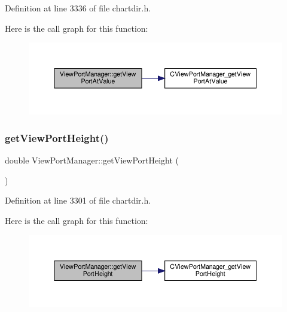 Definition at line 3336 of file chartdir.\+h.

Here is the call graph for this function\+:
\nopagebreak
\begin{figure}[H]
\begin{center}
\leavevmode
\includegraphics[width=350pt]{class_view_port_manager_a74886ad36dd990d09a70fc480cf9d7d7_cgraph}
\end{center}
\end{figure}
\mbox{\label{class_view_port_manager_ad1b3383ca3d0d4a87f1ca56bb8f1cb7e}} 
\subsubsection{\texorpdfstring{get\+View\+Port\+Height()}{getViewPortHeight()}}
{\footnotesize\ttfamily double View\+Port\+Manager\+::get\+View\+Port\+Height (\begin{DoxyParamCaption}{ }\end{DoxyParamCaption})\hspace{0.3cm}{\ttfamily [inline]}}



Definition at line 3301 of file chartdir.\+h.

Here is the call graph for this function\+:
\nopagebreak
\begin{figure}[H]
\begin{center}
\leavevmode
\includegraphics[width=350pt]{class_view_port_manager_ad1b3383ca3d0d4a87f1ca56bb8f1cb7e_cgraph}
\end{center}
\end{figure}
\mbox{\label{class_view_port_manager_a39d80abc4db236ff6657c5974e1a9fda}} 
